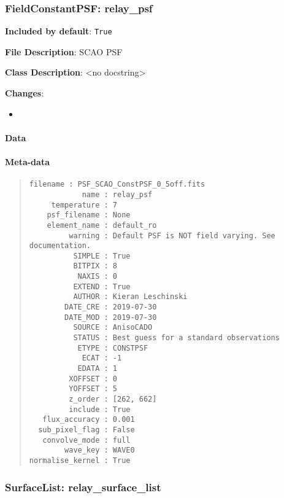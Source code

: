 \subsubsection{FieldConstantPSF: \textquotedbl{}relay\_psf\textquotedbl{}%
  \label{fieldconstantpsf-relay-psf}%
}

\textbf{Included by default}: \texttt{True}

\textbf{File Description}: SCAO PSF

\textbf{Class Description}: <no docstring>

\textbf{Changes}:

\begin{itemize}
\item \end{itemize}


\paragraph{Data%
  \label{data}%
}


\paragraph{Meta-data%
  \label{meta-data}%
}

\begin{quote}
\begin{alltt}
\begin{lstlisting}[frame=single]
        filename : PSF_SCAO_ConstPSF_0_5off.fits
            name : relay_psf
     temperature : 7
    psf_filename : None
    element_name : default_ro
         warning : Default PSF is NOT field varying. See documentation.
          SIMPLE : True
          BITPIX : 8
           NAXIS : 0
          EXTEND : True
          AUTHOR : Kieran Leschinski
        DATE_CRE : 2019-07-30
        DATE_MOD : 2019-07-30
          SOURCE : AnisoCADO
          STATUS : Best guess for a standard observations
           ETYPE : CONSTPSF
            ECAT : -1
           EDATA : 1
         XOFFSET : 0
         YOFFSET : 5
         z_order : [262, 662]
         include : True
   flux_accuracy : 0.001
  sub_pixel_flag : False
   convolve_mode : full
        wave_key : WAVE0
normalise_kernel : True
\end{lstlisting}
\end{alltt}
\end{quote}


\subsubsection{SurfaceList: \textquotedbl{}relay\_surface\_list\textquotedbl{}%
  \label{surfacelist-relay-surface-list}%
}

